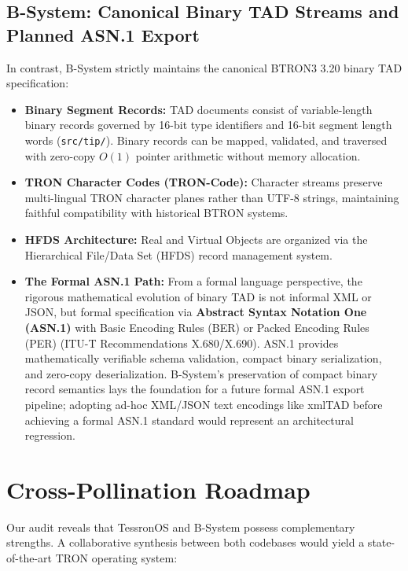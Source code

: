 \documentclass[10pt,journal,compsoc,twocolumn]{article}
\begin{document}
\subsection{B-System: Canonical Binary TAD Streams and Planned ASN.1 Export}
In contrast, B-System strictly maintains the canonical BTRON3 3.20 binary TAD specification:
\begin{itemize}[leftmargin=*]
    \item \textbf{Binary Segment Records:} TAD documents consist of variable-length binary records governed by 16-bit type identifiers and 16-bit segment length words (\texttt{src/tip/}). Binary records can be mapped, validated, and traversed with zero-copy $O(1)$ pointer arithmetic without memory allocation.
    \item \textbf{TRON Character Codes (TRON-Code):} Character streams preserve multi-lingual TRON character planes rather than UTF-8 strings, maintaining faithful compatibility with historical BTRON systems.
    \item \textbf{HFDS Architecture:} Real and Virtual Objects are organized via the Hierarchical File/Data Set (HFDS) record management system.
    \item \textbf{The Formal ASN.1 Path:} From a formal language perspective, the rigorous mathematical evolution of binary TAD is not informal XML or JSON, but formal specification via \textbf{Abstract Syntax Notation One (ASN.1)} with Basic Encoding Rules (BER) or Packed Encoding Rules (PER) (ITU-T Recommendations X.680/X.690). ASN.1 provides mathematically verifiable schema validation, compact binary serialization, and zero-copy deserialization. B-System's preservation of compact binary record semantics lays the foundation for a future formal ASN.1 export pipeline; adopting ad-hoc XML/JSON text encodings like xmlTAD before achieving a formal ASN.1 standard would represent an architectural regression.
\end{itemize}

\section{Cross-Pollination Roadmap}
\label{sec:roadmap}

Our audit reveals that TessronOS and B-System possess complementary strengths. A collaborative synthesis between both codebases would yield a state-of-the-art TRON operating system:
\end{document}
